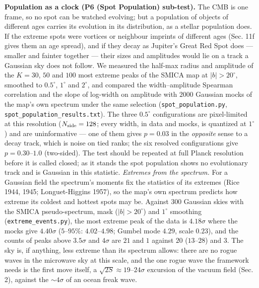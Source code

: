 \documentclass[
  11pt,
]{article}
\begin{document}
\textbf{Population as a clock (P6 (Spot Population) sub-test).} The CMB
is one frame, so no spot can be watched evolving; but a population of
objects of different ages carries its evolution in its distribution, as
a stellar population does. If the extreme spots were vortices or
neighbour imprints of different ages (Sec. 11f gives them an age
spread), and if they decay as Jupiter's Great Red Spot does --- smaller
and fainter together --- their sizes and amplitudes would lie on a track
a Gaussian sky does not follow. We measured the half-max radius and
amplitude of the \(K = 30\), \(50\) and \(100\) most extreme peaks of
the SMICA map at \(|b| > 20^\circ\), smoothed to \(0.5^\circ\),
\(1^\circ\) and \(2^\circ\), and compared the width--amplitude Spearman
correlation and the slope of log-width on amplitude with \(2000\)
Gaussian mocks of the map's own spectrum under the same selection
(\texttt{spot\_population.py}, \texttt{spot\_population\_results.txt}).
The three \(0.5^\circ\) configurations are pixel-limited at this
resolution (\(N_{\rm side} = 128\); every width, in data and mocks, is
quantized at \(1^\circ\)) and are uninformative --- one of them gives
\(p = 0.03\) in the \emph{opposite} sense to a decay track, which is
noise on tied ranks; the six resolved configurations give
\(p = 0.30\)--\(1.0\) (two-sided). The test should be repeated at full
Planck resolution before it is called closed; as it stands the spot
population shows no evolutionary track and is Gaussian in this
statistic. \emph{Extremes from the spectrum.} For a Gaussian field the
spectrum's moments fix the statistics of its extremes (Rice 1944, 1945;
Longuet-Higgins 1957), so the map's own spectrum predicts how extreme
its coldest and hottest spots may be. Against \(300\) Gaussian skies
with the SMICA pseudo-spectrum, mask (\(|b| > 20^\circ\)) and
\(1^\circ\) smoothing (\texttt{extreme\_events.py}), the most extreme
peak of the data is \(4.18\sigma\) where the mocks give \(4.40\sigma\)
(\(5\)--\(95\%\): \(4.02\)--\(4.98\); Gumbel mode \(4.29\), scale
\(0.23\)), and the counts of peaks above \(3.5\sigma\) and \(4\sigma\)
are \(21\) and \(1\) against \(20\) (\(13\)--\(28\)) and \(3\). The sky
is, if anything, less extreme than its spectrum allows: there are no
rogue waves in the microwave sky at this scale, and the one rogue wave
the framework needs is the first move itself, a
\(\sqrt{2S} \approx 19\)--\(24\sigma\) excursion of the vacuum field
(Sec. 2), against the \(\sim 4\sigma\) of an ocean freak wave.
\end{document}
